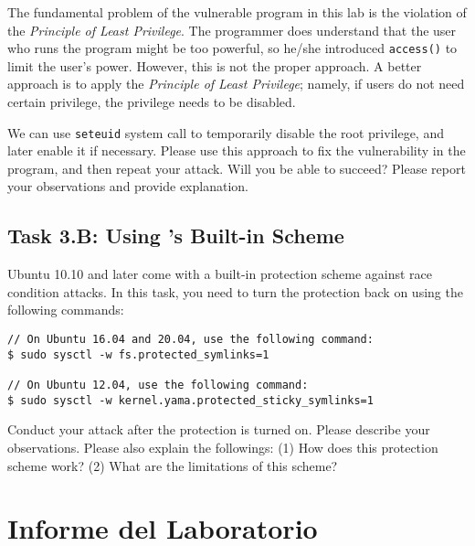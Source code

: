 The fundamental problem of the vulnerable program in this lab is 
the violation of the {\em Principle of Least Privilege}. 
The programmer does understand that the user who runs the program 
might be too powerful, so he/she introduced {\tt access()} to limit the user's 
power. However, this is not the proper approach. A better
approach is to apply the {\em Principle of Least Privilege}; 
namely, if users do not need certain privilege, the privilege
needs to be disabled.

We can use {\tt seteuid{}} system call to temporarily disable
the root privilege, and later enable it if necessary. Please use 
this approach to fix the vulnerability in the program, and then
repeat your attack. Will you be able to succeed? Please report your
observations and provide explanation.



\subsection{Task 3.B: Using \ubuntu's Built-in Scheme}

Ubuntu 10.10 and later come with a built-in protection scheme against race condition
attacks. In this task, you need to turn the protection back on using the
following commands:

\begin{lstlisting}
// On Ubuntu 16.04 and 20.04, use the following command:
$ sudo sysctl -w fs.protected_symlinks=1

// On Ubuntu 12.04, use the following command:
$ sudo sysctl -w kernel.yama.protected_sticky_symlinks=1
\end{lstlisting}

Conduct your attack after the protection is turned on.  
Please describe your observations. Please also explain
the followings: (1) How does this protection scheme work?
(2) What are the limitations of this scheme?






\section{Informe del Laboratorio}





